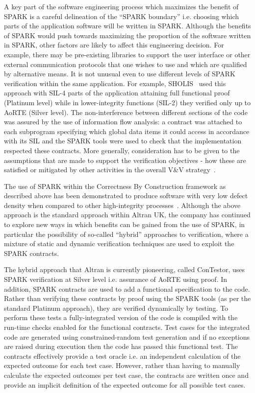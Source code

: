 \documentclass{llncs}
\begin{document}
A key part of the software engineering process which maximizes the benefit of
SPARK is a careful delineation of the ``SPARK boundary'' i.e. choosing which
parts of the application software will be written in SPARK. Although the
benefits of SPARK would push towards maximizing the proportion of the software
written in SPARK, other factors are likely to affect this engineering
decision. For example, there may be pre-existing libraries to support the user
interface or other external communication protocols that one wishes to use and
which are qualified by alternative means. It is not unusual even to use
different levels of SPARK verification within the same application. For example,
SHOLIS~\cite{Croxford2005Manifesto} used this approach with SIL-4 parts of the
application attaining full functional proof (Platinum level) while in
lower-integrity functions (SIL-2) they verified only up to AoRTE (Silver level).
The non-interference between different sections of the code was assured by the
use of information flow analysis: a contract was attached to each subprogram
specifying which global data items it could access in accordance with its SIL
and the SPARK tools were used to check that the implementation respected these
contracts. More generally, consideration has to be given to the assumptions
that are made to support the verification objectives - how these are satisfied
or mitigated by other activities in the overall V\&V
strategy~\cite{kanig2014tap}.

The use of SPARK within the Correctness By Construction framework as described
above has been demonstrated to produce software with very low defect density
when compared to other high-integrity
processes~\cite{Croxford2005Manifesto}. Although the above approach is the
standard approach within Altran UK, the company has continued to explore new ways in
which benefits can be gained from the use of SPARK, in particular the
possibility of so-called ``hybrid'' approaches to verification, where a mixture
of static and dynamic verification techniques are used to exploit the SPARK
contracts.

The hybrid approach that Altran is currently pioneering, called ConTestor, uses
SPARK verification at Silver level i.e. assurance of AoRTE using proof. In
addition, SPARK contracts are used to add a functional specification to the
code. Rather than verifying these contracts by proof using the SPARK tools (as
per the standard Platinum approach), they are verified dynamically by
testing. To perform these tests a fully-integrated version of the code is
compiled with the run-time checks enabled for the functional contracts. Test
cases for the integrated code are generated using constrained-random test
generation and if no exceptions are raised during execution then the code has
passed this functional test. The contracts effectively provide a test oracle
i.e. an independent calculation of the expected outcome for each test
case. However, rather than having to manually calculate the expected outcomes
per test case, the contracts are written once and provide an implicit
definition of the expected outcome for all possible test cases.
\end{document}
